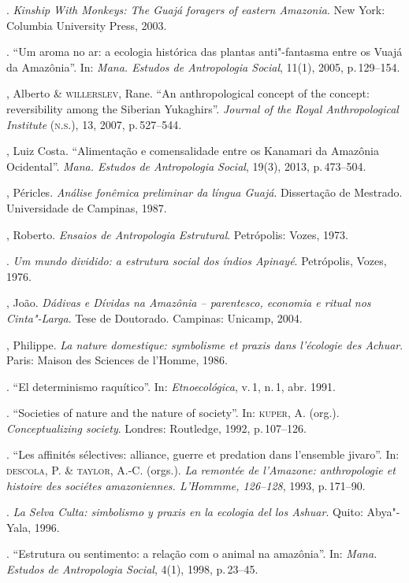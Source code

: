 \begin{bibliohedra}
\titidem. \emph{Kinship With Monkeys: The Guajá foragers of eastern
Amazonia}. New York: Columbia University Press, 2003.

\titidem. ``Um aroma no ar: a ecologia histórica das plantas
anti"-fantasma entre os Vuajá da Amazônia''. In: \emph{Mana.
Estudos de Antropologia Social}, 11(1), 2005, p.\,129--154.

, Alberto \& \textsc{willerslev}, Rane.
``An anthropological concept of the concept:
reversibility among the Siberian Yukaghirs''. \emph{Journal of the Royal
Anthropological Institute} (\textsc{n.s.}), 13, 2007, p.\,527--544.

, Luiz Costa. ``Alimentação e comensalidade entre os Kanamari da
Amazônia Ocidental''. \emph{Mana. Estudos de Antropologia Social}, 19(3), 2013, p.\,473--504.

, Péricles. \emph{Análise fonêmica preliminar da língua Guajá}.
Dissertação de Mestrado. Universidade de Campinas, 1987.

, Roberto. \emph{Ensaios de Antropologia Estrutural}. Petrópolis:
Vozes, 1973.

\titidem. \emph{Um mundo dividido: a estrutura social dos índios
Apinayé}. Petrópolis, Vozes, 1976.

, João. \emph{Dádivas e Dívidas na Amazônia -- parentesco,
economia e ritual nos Cinta"-Larga}. Tese de Doutorado. Campinas:
Unicamp, 2004.

, Philippe. \emph{La nature domestique: symbolisme et praxis dans
l'écologie des Achuar}. Paris: Maison des Sciences de l'Homme, 1986.

\titidem. ``El determinismo raquítico''. In: \emph{Etnoecológica},
v.\,1, n.\,1, abr. 1991.

\titidem. ``Societies of nature and the nature of society''. In: \textsc{kuper}, A.
(org.). \emph{Conceptualizing society}. Londres: Routledge, 1992, p.\,107--126.

\titidem. ``Les affinités sélectives: alliance, guerre et predation
dans l'ensemble jivaro''. In: \textsc{descola}, P. \& \textsc{taylor}, A.-C. (orgs.). \emph{La remontée de l'Amazone: anthropologie et histoire des sociétes
amazoniennes. L'Hommme, 126--128}, 1993, p.\,171--90.

\titidem. \emph{La Selva Culta: simbolismo y praxis en la ecologia del
los Ashuar}. Quito: Abya"-Yala, 1996.

\titidem. ``Estrutura ou sentimento: a relação com o animal na
amazônia''. In: \emph{Mana. Estudos de Antropologia Social}, 4(1), 1998, p.\,23--45.


\end{bibliohedra}
